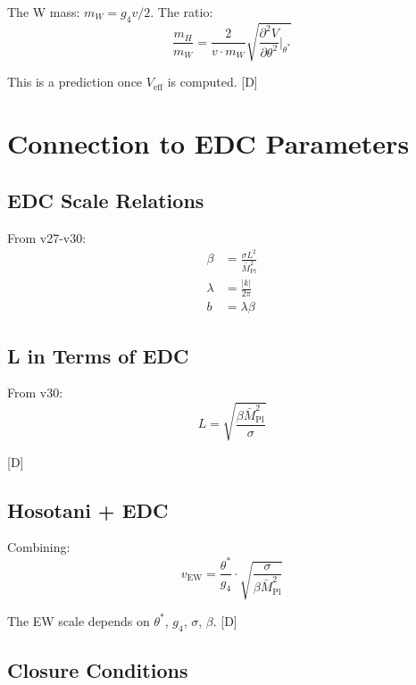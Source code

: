 \documentclass[11pt,a4paper]{article}
\newcommand{\tagD}{\textcolor{blue!70!black}{[D]}}
\begin{document}
The W mass: $m_W = g_4 v / 2$. The ratio:
\begin{equation}
\label{eq:mH-mW-ratio}
\frac{m_H}{m_W} = \frac{2}{v \cdot m_W} \sqrt{\frac{\partial^2 V}{\partial \theta^2}\bigg|_{\theta^*}}
\end{equation}

This is a prediction once $V_{\text{eff}}$ is computed. \tagD

\section{Connection to EDC Parameters}

\subsection{EDC Scale Relations}

From v27-v30:
\begin{align}
\label{eq:edc-beta}
\beta &= \frac{\sigma L^2}{\bar{M}_{\text{Pl}}^2} \\
\label{eq:edc-lambda}
\lambda &= \frac{|k|}{2\pi} \\
\label{eq:edc-b}
b &= \lambda \beta
\end{align}

\subsection{L in Terms of EDC}

From v30:
\begin{equation}
\label{eq:L-edc}
L = \sqrt{\frac{\beta \bar{M}_{\text{Pl}}^2}{\sigma}}
\end{equation}

\tagD

\subsection{Hosotani + EDC}

Combining:
\begin{equation}
\label{eq:hosotani-edc}
v_{\text{EW}} = \frac{\theta^*}{g_4} \cdot \sqrt{\frac{\sigma}{\beta \bar{M}_{\text{Pl}}^2}}
\end{equation}

The EW scale depends on $\theta^*$, $g_4$, $\sigma$, $\beta$. \tagD

\subsection{Closure Conditions}
\end{document}
